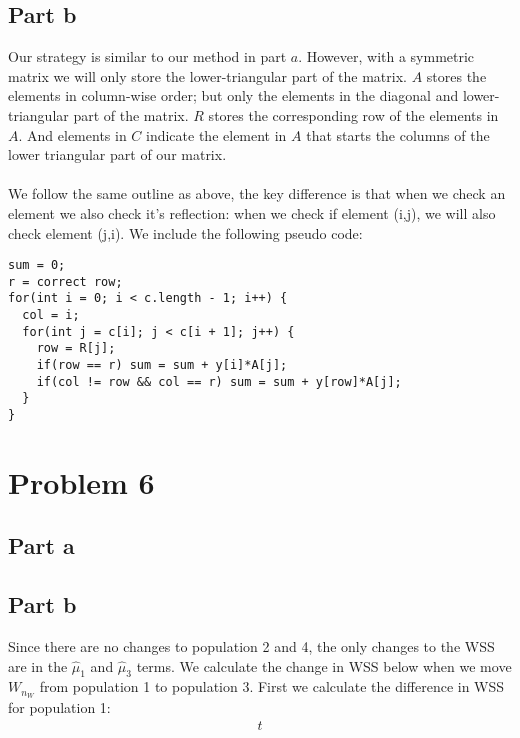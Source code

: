 \documentclass{article}\usepackage[]{graphicx}\usepackage[]{color}
\begin{document}
\subsection*{Part b}
Our strategy is similar to our method in part $a$.  However, with a symmetric matrix we will only store the lower-triangular part of the matrix.  $A$ stores the elements in column-wise order; but only the elements in the diagonal and lower-triangular part of the matrix.  $R$ stores the corresponding row of the elements in $A$.  And elements in $C$ indicate the element in $A$ that starts the columns of the lower triangular part of our matrix.\\
\\
We follow the same outline as above, the key difference is that when we check an element we also check it's reflection: when we check if element (i,j), we will also check element (j,i).  We include the following pseudo code:
\begin{verbatim}
sum = 0;
r = correct row;
for(int i = 0; i < c.length - 1; i++) {
  col = i;
  for(int j = c[i]; j < c[i + 1]; j++) {
    row = R[j];
    if(row == r) sum = sum + y[i]*A[j];
    if(col != row && col == r) sum = sum + y[row]*A[j];
  }
}
\end{verbatim}


\section*{Problem 6}
\subsection*{Part a}


\subsection*{Part b}
Since there are no changes to population 2 and 4, the only changes to the WSS are in the $\hat{\mu}_1$ and $\hat{\mu}_3$ terms.  We calculate the change in WSS below when we move $W_{n_W}$ from population 1 to population 3.  First we calculate the difference in WSS for population 1:
\begin{align*}
t
\end{align*}
\end{document}
